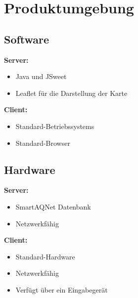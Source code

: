 \section{Produktumgebung}
\subsection{Software}
\textbf{Server:}
\begin{itemize} [noitemsep]
    \item Java und JSweet
    \item Leaflet für die Darstellung der Karte
\end{itemize}
\textbf{ Client:}
\begin{itemize} [noitemsep]
    \item \glspl{Standard-Betriebssystem}
    \item \gls{Standard-Browser}
\end{itemize}
\subsection{Hardware}
\textbf{Server:}
\begin{itemize} [noitemsep]
    \item SmartAQNet Datenbank
    \item Netzwerkfähig 
\end{itemize}
\textbf{Client:}
\begin{itemize} [noitemsep]
    \item \gls{Standard-Hardware}
    \item Netzwerkfähig 
    \item Verfügt über ein Eingabegerät
\end{itemize}